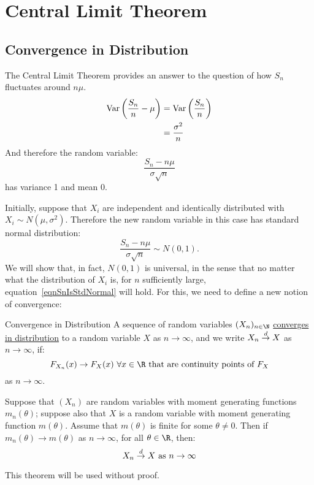 \documentclass[../Main.tex]{subfiles}
\begin{document}
\section{Central Limit Theorem}
\subsection{Convergence in Distribution}
The Central Limit Theorem provides an answer to the question of how $S_n$ fluctuates around $n\mu$.
\begin{align*}
    \operatorname{Var}\left(\frac{S_n}{n} - \mu\right) &= \operatorname{Var}\left(\frac{S_n}{n}\right) \\
    &= \frac{\sigma^2}{n}
\end{align*}
And therefore the random variable:
\begin{equation*}
    \frac{S_n - n\mu}{\sigma\sqrt{n}}
\end{equation*}
has variance 1 and mean 0.

Initially, suppose that $X_i$ are independent and identically distributed with $X_i \sim N(\mu, \sigma^2)$.
Therefore the new random variable in this case has standard normal distribution:
\begin{equation}
    \frac{S_n - n\mu}{\sigma\sqrt{n}} \sim N(0, 1).
    \label{eqnSnIsStdNormal}
\end{equation}
We will show that, in fact, $N(0, 1)$ is universal, in the sense that no matter what the distribution of $X_i$ is, for $n$ sufficiently large, equation~\ref{eqnSnIsStdNormal} will hold.
For this, we need to define a new notion of convergence:
\begin{definition}{Convergence in Distribution}
    A sequence of random variables $(X_n)_{n \in \N}$ \underline{converges in distribution} to a random variable $X$ as $n \to \infty$, and we write $X_n \overset{d}{\rightarrow} X$ as $n \to \infty$, if:
    \begin{equation*}
        F_{X_n}(x) \to F_X(x)~\forall x \in \R \text{ that are continuity points of } F_X
    \end{equation*}
    as $n \to \infty$.
\end{definition}
\begin{theorem}
    Suppose that $(X_n)$ are random variables with moment generating functions $m_n(\theta)$; suppose also that $X$ is a random variable with moment generating function $m(\theta)$. Assume that $m(\theta)$ is finite for some $\theta \neq 0$. Then if $m_n(\theta) \to m(\theta)$ as $n \to \infty$, for all $\theta \in \R$, then:
    \begin{equation*}
        X_n \overset{d}{\rightarrow} X \text{ as } n \to \infty
    \end{equation*}
    \label{thmMGFContinuity}
\end{theorem}
This theorem will be used without proof.
\end{document}
